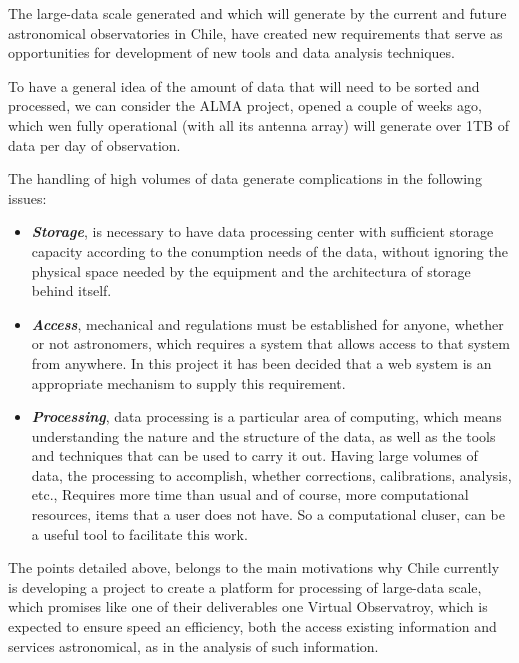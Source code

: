 The large-data scale generated and which will generate by the current and
future astronomical observatories in Chile, have created new requirements that
serve as opportunities for development of new tools and data analysis
techniques.

To have a general idea of the amount of data that will need to be sorted and
processed, we can consider the ALMA project, opened a couple of weeks ago,
which wen fully operational (with all its antenna array) will generate over 1TB
of data per day of observation.

The handling of high volumes of data generate complications in the following
issues:

\begin{itemize}
	\item \emph{\textbf{Storage}}, is necessary to have data processing 
		center with sufficient storage capacity according to the 
		conumption needs of the data, without ignoring the physical 
		space needed by the equipment and the architectura
		of storage behind itself.
	\item \emph{\textbf{Access}}, mechanical and regulations must be 
		established for anyone, whether or not astronomers, which 
		requires a system that allows access to that system from anywhere. 
		In this project it has been decided that a web system is an
		appropriate mechanism to supply this requirement.
	\item \emph{\textbf{Processing}}, data processing is a particular area
		of computing, which means understanding the nature and the 
		structure of the data, as well as the tools and techniques
		that can be used to carry it out. Having large volumes of data,
		the processing to accomplish, whether corrections, calibrations,
		analysis, etc., Requires more time than usual and of course,
		more computational resources, items that a user does not have.
		So a computational cluser, can be a useful tool to facilitate
		this work.
\end{itemize}

The points detailed above, belongs to the main motivations why Chile currently
is developing a project to create a platform for processing of large-data
scale, which promises like one of their deliverables one Virtual Observatroy,
which is expected to ensure speed an efficiency, both the access existing
information and services astronomical, as in the analysis of such information.
